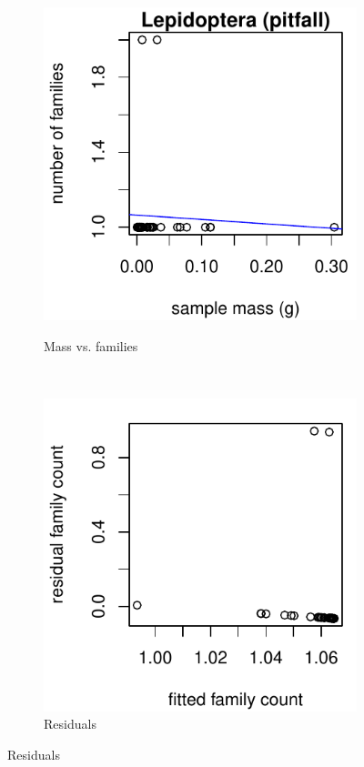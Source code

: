 \documentclass[10pt,letterpaper,twocolumn]{article}
\begin{document}
\begin{figure}[h]
	\centering
	\begin{subfigure}[b]{0.15\textwidth}
		\caption{Mass vs. families}
		\includegraphics[width=\textwidth]{plots/mass-vs-count/scatter/2015_pitfall_Lepidoptera_mass-vs-count.pdf}
		\label{fig:pitfall_lepidoptera_scatter}
	\end{subfigure}
	~
	\begin{subfigure}[b]{0.15\textwidth}
		\caption{Residuals}
		\includegraphics[width=\textwidth]{plots/mass-vs-count/residual/2015_pitfall_Lepidoptera_residual.pdf}

\end{subfigure}
\end{figure}
\end{document}
